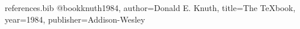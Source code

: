 \begin{filecontents*}{references.bib}
@book{knuth1984, author={Donald E. Knuth}, title={The TeXbook}, year={1984}, publisher={Addison-Wesley}}
\end{filecontents*}
\documentclass{article}

Typesetting~\cite{knuth1984}.



